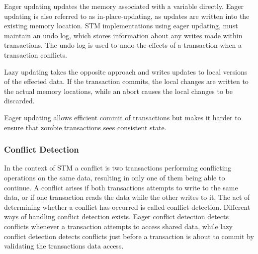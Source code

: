 Eager updating updates the memory associated with a variable directly. Eager updating is also referred to as in-place-updating, as updates are written into the existing memory location\cite[p. 35]{afek2011lowering}. \ac{STM} implementations using eager updating, must maintain an undo log, which stores information about any writes made within transactions. The undo log is used to undo the effects of a transaction when a transaction conflicts\cite[p. 2084]{herlihy2011tm}.

Lazy updating takes the opposite approach and writes updates to local versions of the effected data\cite[p. 2084]{herlihy2011tm}. If the transaction commits, the local changes are written to the actual memory locations, while an abort causes the local changes to be discarded.

Eager updating allows efficient commit of transactions but makes it harder to ensure that zombie transactions sees consistent state\cite[p. 2084]{herlihy2011tm}.

\subsubsection{Conflict Detection}
In the context of \ac{STM} a conflict is two transactions performing conflicting operations on the same data, resulting in only one of them being able to continue\cite[p. 20]{harris2010transactional}. A conflict arises if both transactions attempts to write to the same data, or if one transaction reads the data while the other writes to it. The act of determining whether a conflict has occurred is called conflict detection\cite[p. 20]{harris2010transactional}. Different ways of handling conflict detection exists. Eager conflict detection detects conflicts whenever a transaction attempts to access shared data, while lazy conflict detection detects conflicts just before a transaction is about to commit by validating the transactions data access\cite[p. 21]{harris2010transactional}. 

